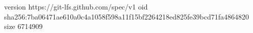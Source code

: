 version https://git-lfs.github.com/spec/v1
oid sha256:7ba06471ae610a0c4a1058f598a11f15bf2264218ed825fe39bcd71fa4864820
size 6714909
